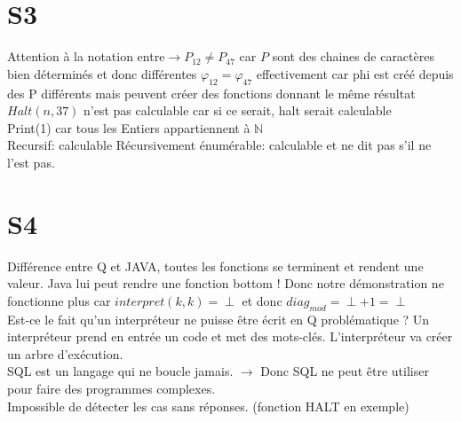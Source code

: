 \documentclass{report}
\begin{document}
\section{S3}
Attention à la notation entre$ \rightarrow P_{12} \neq P_{47}$ car $P$ sont des chaines de caractères bien déterminés et donc différentes
$\varphi_{12}=\varphi_{47}$ effectivement car phi est créé depuis des P différents mais peuvent créer des fonctions donnant le même résultat\\

$Halt(n,37)$ n'est pas calculable car si ce serait, halt serait calculable\\
Print(1) car tous les Entiers appartiennent à $\mathbb{N}$\\

Recursif: calculable
Récursivement énumérable: calculable et ne dit pas s'il ne l'est pas.

\section{S4}
Différence entre Q et JAVA, toutes les fonctions se terminent et rendent une valeur. 
Java lui peut rendre une fonction bottom !
Donc notre démonstration ne fonctionne plus car $interpret(k,k)= \perp$ et donc $diag_{mod}= \perp+1= \perp$\\

Est-ce le fait qu'un interpréteur ne puisse être écrit en Q problématique ?
Un interpréteur prend en entrée un code et met des mots-clés. L'interpréteur va créer un arbre d'exécution.\\
SQL est un langage qui ne boucle jamais. $\rightarrow$ Donc SQL ne peut être utiliser pour faire des programmes complexes.\\

Impossible de détecter les cas sans réponses. (fonction HALT en exemple)
\end{document}
